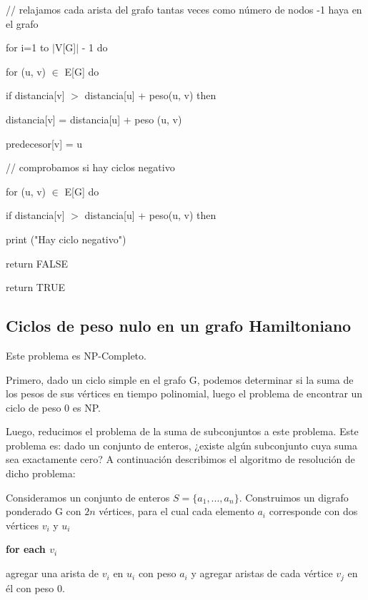 \documentclass[a4paper,10pt]{article}
\begin{document}
\bigskip
\quad // relajamos cada arista del grafo tantas veces como número de nodos -1 haya en el grafo
       
\quad for i=1 to \(|\)V[G]\(|\) - 1 do
       
\quad\quad for (u, v) \(\in\)  E[G] do
       
\quad\quad\quad if distancia[v] \(>\) distancia[u] + peso(u, v) then
       
\quad\quad\quad\quad distancia[v] = distancia[u] + peso (u, v)
       
\quad\quad\quad\quad predecesor[v] = u

\bigskip       
\quad // comprobamos si hay ciclos negativo
       
\quad for (u, v) \(\in\) E[G] do
       
\quad\quad if distancia[v] \(>\) distancia[u] + peso(u, v) then
       
\quad\quad\quad print ("Hay ciclo negativo")
       
\quad\quad\quad return FALSE

\bigskip       
\quad return TRUE


\subsection{Ciclos de peso nulo en un grafo Hamiltoniano}

Este problema es NP-Completo.
 
Primero, dado un ciclo simple en el grafo G, podemos determinar si la suma de los pesos de sus vértices en tiempo polinomial, luego el problema de encontrar un ciclo de peso 0 es NP.

Luego, reducimos el problema de la suma de subconjuntos a este problema. Este problema es: dado un conjunto de enteros, ¿existe algún subconjunto cuya suma sea exactamente cero? A continuación describimos el algoritmo de resolución de dicho problema:

\bigskip

Consideramos un conjunto de enteros \( S = \{ a_{1}, . . . , a_{n} \}  \). Construimos un digrafo ponderado G con \( 2n \) vértices, para el cual cada elemento \( a_{i} \) corresponde con dos vértices \( v_{i} \) y \( u_{i} \)

\textbf{\textcolor[rgb]{0.0,0.5019608,0.0}{for each }}\( v_{i} \)

\quad agregar una arista de \( v_{i} \) en \( u_{i} \) con peso \( a_{i} \) y agregar aristas de cada vértice \( v_{j} \) en él con peso 0.
\end{document}
